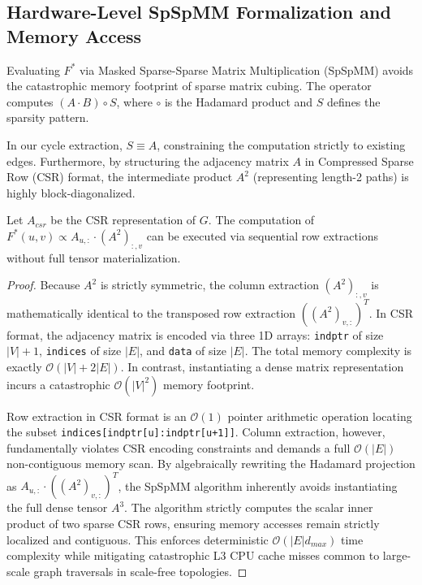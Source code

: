 \documentclass{siuro250211}
\begin{document}
\subsection{Hardware-Level SpSpMM Formalization and Memory Access}
Evaluating $F^*$ via Masked Sparse-Sparse Matrix Multiplication (SpSpMM) avoids the catastrophic memory footprint of sparse matrix cubing. The operator computes $(A \cdot B) \circ S$, where $\circ$ is the Hadamard product and $S$ defines the sparsity pattern.

In our cycle extraction, $S \equiv A$, constraining the computation strictly to existing edges. Furthermore, by structuring the adjacency matrix $A$ in Compressed Sparse Row (CSR) format, the intermediate product $A^2$ (representing length-2 paths) is highly block-diagonalized. 

\begin{theorem}
Let $A_{csr}$ be the CSR representation of $G$. The computation of $F^*(u,v) \propto A_{u,:} \cdot (A^2)_{:,v}$ can be executed via sequential row extractions without full tensor materialization.
\end{theorem}

\begin{proof}
Because $A^2$ is strictly symmetric, the column extraction $(A^2)_{:,v}$ is mathematically identical to the transposed row extraction $((A^2)_{v,:})^T$. In CSR format, the adjacency matrix is encoded via three 1D arrays: \texttt{indptr} of size $|V|+1$, \texttt{indices} of size $|E|$, and \texttt{data} of size $|E|$. The total memory complexity is exactly $\mathcal{O}(|V| + 2|E|)$. In contrast, instantiating a dense matrix representation incurs a catastrophic $\mathcal{O}(|V|^2)$ memory footprint.

Row extraction in CSR format is an $\mathcal{O}(1)$ pointer arithmetic operation locating the subset \texttt{indices[indptr[u]:indptr[u+1]]}. Column extraction, however, fundamentally violates CSR encoding constraints and demands a full $\mathcal{O}(|E|)$ non-contiguous memory scan. By algebraically rewriting the Hadamard projection as $A_{u,:} \cdot ((A^2)_{v,:})^T$, the SpSpMM algorithm inherently avoids instantiating the full dense tensor $A^3$. The algorithm strictly computes the scalar inner product of two sparse CSR rows, ensuring memory accesses remain strictly localized and contiguous. This enforces deterministic $\mathcal{O}(|E| d_{max})$ time complexity while mitigating catastrophic L3 CPU cache misses common to large-scale graph traversals in scale-free topologies.
\end{proof}
\end{document}
